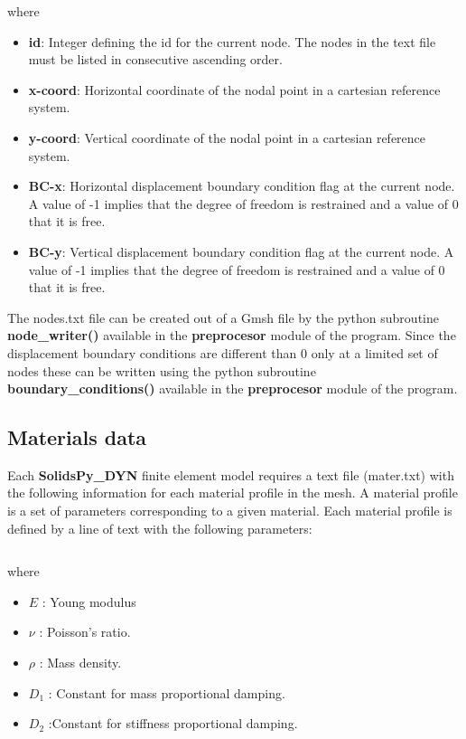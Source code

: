 \documentclass[11pt,letterpaper]{article}
\begin{document}
where
\begin{itemize}
\item {\bf id}: Integer defining the id for the current node. The nodes in the text file must be listed in consecutive ascending order.
\item {\bf x-coord}: Horizontal coordinate of the nodal point in a cartesian reference system.
\item {\bf y-coord}: Vertical coordinate of the nodal point in a cartesian reference system.
\item{\bf  BC-x}: Horizontal displacement boundary condition flag at the current node. A value of -1 implies that the degree of freedom is restrained and a value of 0 that it is free.
\item{\bf  BC-y}: Vertical displacement boundary condition flag at the current node. A value of -1 implies that the degree of freedom is restrained and a value of 0 that it is free.
\end{itemize}

The nodes.txt file can be created out of a Gmsh file by the python subroutine {\bf node\_writer()} available in the {\bf preprocesor} module of the program. Since the displacement boundary conditions are different than 0 only at a limited set of nodes these can be written using the python subroutine {\bf boundary\_conditions()} available in the {\bf preprocesor} module of the program.
               

\subsection{Materials data}
Each {\bf SolidsPy\_DYN} finite element model requires a text file (mater.txt) with the following information for each material profile in the mesh. A material profile is a set of parameters corresponding to a given material. Each material profile is defined by a line of text with the following parameters:

\inputminted[mathescape,
               numbersep=5pt,
               gobble=0,
               frame=lines,
               framesep=2mm]{c}{materT.txt}

where
\begin{itemize}
\item $E$      : Young modulus
\item $\nu$   : Poisson's ratio.
\item $\rho$  : Mass density.
\item $D_1$  : Constant for mass proportional damping.
\item $D_2$  :Constant for stiffness proportional damping.
\end{itemize}
\end{document}
